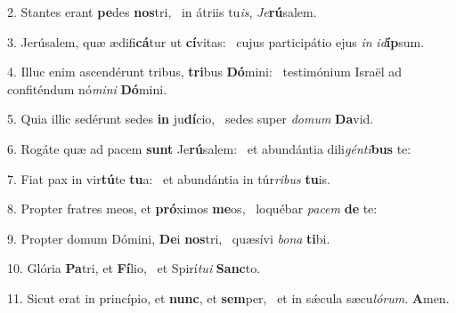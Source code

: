 2. Stantes erant \textbf{pe}des \textbf{nos}tri, \ast\  in átriis tu\textit{is}, \textit{Je}\textbf{rú}salem.\

3. Jerúsalem, quæ ædifi\textbf{cá}tur ut \textbf{cí}vitas: \ast\  cujus participátio ejus \textit{in} \textit{id}\textbf{íp}sum.\

4. Illuc enim ascendérunt tribus, \textbf{tri}bus \textbf{Dó}mini: \ast\  testimónium Israël ad confiténdum nó\textit{mi}\textit{ni} \textbf{Dó}mini.\

5. Quia illic sedérunt sedes \textbf{in} ju\textbf{dí}cio, \ast\  sedes super \textit{do}\textit{mum} \textbf{Da}vid.\

6. Rogáte quæ ad pacem \textbf{sunt} Je\textbf{rú}salem: \ast\  et abundántia dili\textit{gén}\textit{ti}\textbf{bus} te:\

7. Fiat pax in vir\textbf{tú}te \textbf{tu}a: \ast\  et abundántia in túr\textit{ri}\textit{bus} \textbf{tu}is.\

8. Propter fratres meos, et \textbf{pró}ximos \textbf{me}os, \ast\  loquébar \textit{pa}\textit{cem} \textbf{de} te:\

9. Propter domum Dómini, \textbf{De}i \textbf{nos}tri, \ast\  quæsívi \textit{bo}\textit{na} \textbf{ti}bi.\

10. Glória \textbf{Pa}tri, et \textbf{Fí}lio, \ast\  et Spirí\textit{tu}\textit{i} \textbf{Sanc}to.\

11. Sicut erat in princípio, et \textbf{nunc}, et \textbf{sem}per, \ast\  et in sǽcula sæcu\textit{ló}\textit{rum}. \textbf{A}men.\

